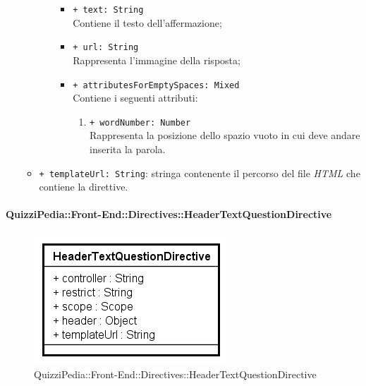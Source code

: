 \begin{itemize}
\begin{itemize}
\begin{itemize}
\begin{itemize}
						\item \texttt{+ text: String} \\ Contiene il testo dell'affermazione;
						\item \texttt{+ url: String} \\ Rappresenta l'immagine della risposta;
						\item \texttt{+ attributesForEmptySpaces: Mixed} \\ Contiene i seguenti attributi:
						\begin{enumerate}
							\item \texttt{+ wordNumber: Number} \\ Rappresenta la posizione dello spazio vuoto in cui deve andare inserita la parola.
						\end{enumerate}
					\end{itemize}
				\end{itemize}
				\item \texttt{+ templateUrl: String}: stringa contenente il percorso del file \textit{HTML} che contiene la direttive.
			\end{itemize}
		\end{itemize}
		
		\paragraph{QuizziPedia::Front-End::Directives::HeaderTextQuestionDirective}
		
		\label{QuizziPedia::Front-End::Directives::HeaderTextQuestionDirective}
		
		\begin{figure}[ht]
			\centering
			\includegraphics[scale=0.80,keepaspectratio]{UML/Classi/Front-End/QuizziPedia_Front-end_Templates_HeaderTextQuestionTemplate.png}
			\caption{QuizziPedia::Front-End::Directives::HeaderTextQuestionDirective}
		\end{figure} \FloatBarrier
		
